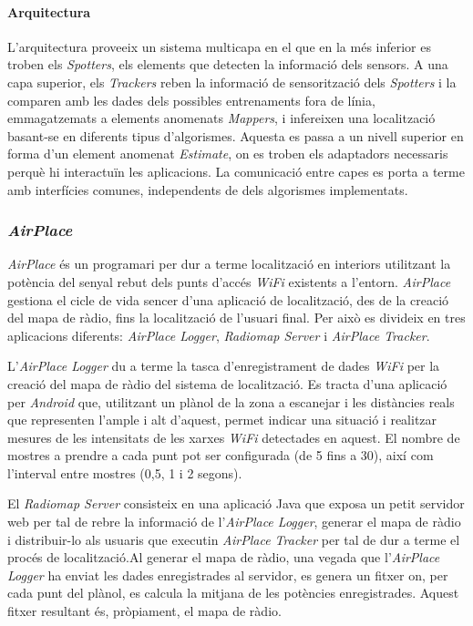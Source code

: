 \paragraph{Arquitectura}

L'arquitectura proveeix un sistema multicapa en el que en la més inferior es troben els \textit{Spotters}, els elements que detecten la informació dels sensors. A una capa superior, els \textit{Trackers} reben la informació de sensorització dels \textit{Spotters} i la comparen amb les dades dels possibles entrenaments fora de línia, emmagatzemats a elements anomenats \textit{Mappers}, i infereixen una localització basant-se en diferents tipus d’algorismes. Aquesta es passa a un nivell superior en forma d'un element anomenat \textit{Estimate}, on es troben els adaptadors necessaris perquè hi interactuïn les aplicacions. La comunicació entre capes es porta a terme amb interfícies comunes, independents de dels algorismes implementats.

\subsubsection{\textit{AirPlace}}

\textit{AirPlace} \cite{laoudias} és un programari per dur a terme localització en interiors utilitzant la potència del senyal rebut dels punts d'accés \textit{WiFi} existents a l'entorn. \textit{AirPlace} gestiona el cicle de vida sencer d'una aplicació de localització, des de la creació del mapa de ràdio, fins la localització de l'usuari final. Per això es divideix en tres aplicacions diferents: \textit{AirPlace Logger}, \textit{Radiomap Server} i \textit{AirPlace Tracker}.

L'\textit{AirPlace Logger} du a terme la tasca d'enregistrament de dades \textit{WiFi} per la creació del mapa de ràdio del sistema de localització. Es tracta d'una aplicació per \textit{Android} que, utilitzant un plànol de la zona a escanejar i les distàncies reals que representen l'ample i alt d'aquest, permet indicar una situació i realitzar mesures de les intensitats de les xarxes \textit{WiFi} detectades en aquest. El nombre de mostres a prendre a cada punt pot ser configurada (de 5 fins a 30), així com l'interval entre mostres (0,5, 1 i 2 segons).

El \textit{Radiomap Server} consisteix en una aplicació Java que exposa un petit servidor web per tal de rebre la informació de l'\textit{AirPlace Logger}, generar el mapa de ràdio i distribuir-lo als usuaris que executin \textit{AirPlace Tracker} per tal de dur a terme el procés de localització.Al generar el mapa de ràdio, una vegada que l'\textit{AirPlace Logger} ha enviat les dades enregistrades al servidor, es genera un fitxer on, per cada punt del plànol, es calcula la mitjana de les potències enregistrades. Aquest fitxer resultant és, pròpiament, el mapa de ràdio.

